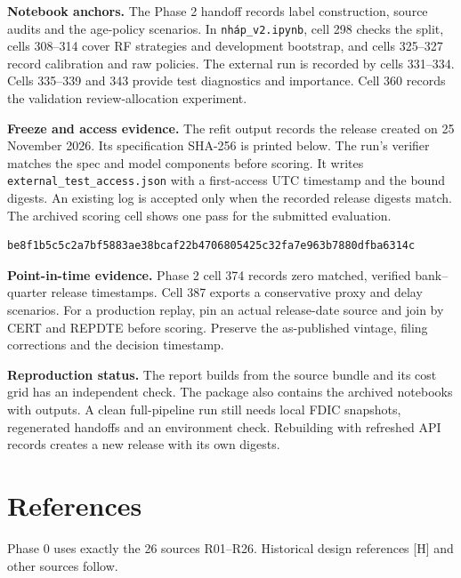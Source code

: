 \documentclass[
  12pt,
  a4paper,
]{article}
\newcommand{\parttag}{Main report}
\begin{document}
\textbf{Notebook anchors.} The Phase 2 handoff records label
construction, source audits and the age-policy scenarios. In
\texttt{nháp\_v2.ipynb}, cell 298 checks the split, cells 308--314 cover
RF strategies and development bootstrap, and cells 325--327 record
calibration and raw policies. The external run is recorded by cells
331--334. Cells 335--339 and 343 provide test diagnostics and
importance. Cell 360 records the validation review-allocation
experiment.

\textbf{Freeze and access evidence.} The refit output records the
release created on 25 November 2026. Its specification SHA-256 is
printed below. The run's verifier matches the spec and model components
before scoring. It writes \texttt{external\_test\_access.json} with a
first-access UTC timestamp and the bound digests. An existing log is
accepted only when the recorded release digests match. The archived
scoring cell shows one pass for the submitted evaluation.

\begin{verbatim}
be8f1b5c5c2a7bf5883ae38bcaf22b4706805425c32fa7e963b7880dfba6314c
\end{verbatim}

\textbf{Point-in-time evidence.} Phase 2 cell 374 records zero matched,
verified bank--quarter release timestamps. Cell 387 exports a
conservative proxy and delay scenarios. For a production replay, pin an
actual release-date source and join by CERT and REPDTE before scoring.
Preserve the as-published vintage, filing corrections and the decision
timestamp.

\textbf{Reproduction status.} The report builds from the source bundle
and its cost grid has an independent check. The package also contains
the archived notebooks with outputs. A clean full-pipeline run still
needs local FDIC snapshots, regenerated handoffs and an environment
check. Rebuilding with refreshed API records creates a new release with
its own digests.

\clearpage

\renewcommand{\parttag}{References}

\section{References}\label{references}

Phase 0 uses exactly the 26 sources R01--R26. Historical design
references {[}H{]} and other sources follow.
\end{document}
